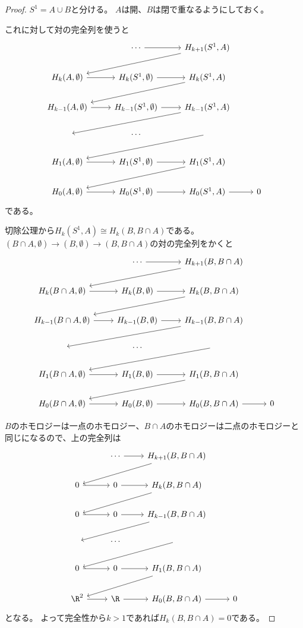 \documentclass{jsarticle}
\begin{document}
\begin{proof}
$S^1=A\cup B$と分ける。
$A$は開、$B$は閉で重なるようにしておく。

これに対して対の完全列を使うと
\[
\begin{tikzcd}
~ &\cdots \ar[r] &H_{k+1}(S^1,A) \ar[dll]\\
H_k(A,\emptyset) \ar[r] &H_k(S^1,\emptyset) \ar[r] &H_k(S^1,A) \ar[dll]\\
H_{k-1}(A,\emptyset) \ar[r] &H_{k-1}(S^1,\emptyset) \ar[r] &H_{k-1}(S^1,A) \ar[dll]\\
~&\cdots&\ar[dll]\\
H_{1}(A,\emptyset) \ar[r] &H_{1}(S^1,\emptyset) \ar[r] &H_{1}(S^1,A) \ar[dll]\\
H_{0}(A,\emptyset) \ar[r] &H_{0}(S^1,\emptyset) \ar[r] &H_{0}(S^1,A) \ar[r]&0
\end{tikzcd}
\]
である。

切除公理から$H_k(S^1,A)\cong H_k(B,B\cap A)$である。
$(B\cap A,\emptyset)\to(B,\emptyset)\to(B,B\cap A)$の対の完全列をかくと
\[
\begin{tikzcd}
~ &\cdots \ar[r] &H_{k+1}(B,B\cap A) \ar[dll]\\
H_k(B\cap A,\emptyset) \ar[r] &H_k(B,\emptyset) \ar[r] &H_k(B,B\cap A) \ar[dll]\\
H_{k-1}(B\cap A,\emptyset) \ar[r] &H_{k-1}(B,\emptyset) \ar[r] &H_{k-1}(B,B\cap A) \ar[dll]\\
~&\cdots&\ar[dll]\\
H_{1}(B\cap A,\emptyset) \ar[r] &H_{1}(B,\emptyset) \ar[r] &H_{1}(B,B\cap A) \ar[dll]\\
H_{0}(B\cap A,\emptyset) \ar[r] &H_{0}(B,\emptyset) \ar[r] &H_{0}(B,B\cap A) \ar[r]&0
\end{tikzcd}
\]

$B$のホモロジーは一点のホモロジー、$B\cap A$のホモロジーは二点のホモロジーと同じになるので、上の完全列は
\[
\begin{tikzcd}
~ &\cdots \ar[r] &H_{k+1}(B,B\cap A) \ar[dll]\\
0 \ar[r] &0 \ar[r] &H_k(B,B\cap A) \ar[dll]\\
0 \ar[r] &0 \ar[r] &H_{k-1}(B,B\cap A) \ar[dll]\\
~&\cdots&\ar[dll]\\
0 \ar[r] &0 \ar[r] &H_{1}(B,B\cap A) \ar[dll]\\
\R^2 \ar[r] &\R \ar[r] &H_{0}(B,B\cap A) \ar[r]&0
\end{tikzcd}
\]
となる。
よって完全性から$k>1$であれば$H_k(B,B\cap A)=0$である。


\end{proof}
\end{document}
